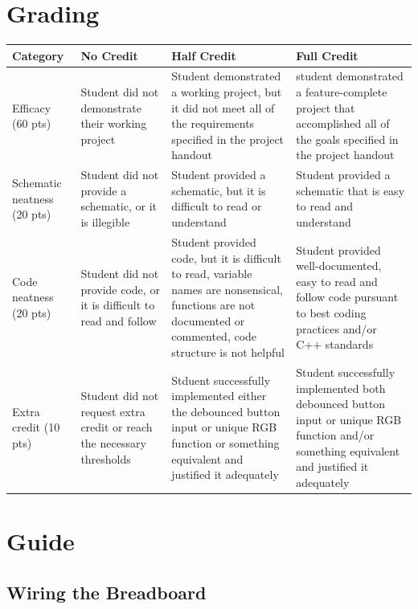 \documentclass{article}
\begin{document}
\section*{Grading}
\begin{tabular}{ | p{1in} | p{1.75in} | p{1.75in} | p{1.75in} | }
    \hline
    \textbf{Category} & \textbf{No Credit} & \textbf{Half Credit} & \textbf{Full Credit} \\

    \hline
    Efficacy (60 pts) & 
    Student did not demonstrate their working project & 
    Student demonstrated a working project, but it did not meet all of the requirements specified in the project handout & 
    student demonstrated a feature-complete project that accomplished all of the goals specified in the project handout \\
    \hline
    Schematic neatness (20 pts) & 
    Student did not provide a schematic, or it is illegible &
    Student provided a schematic, but it is difficult to read or understand &
    Student provided a schematic that is easy to read and understand \\
    \hline
    Code neatness (20 pts) &
    Student did not provide code, or it is difficult to read and follow &
    Student provided code, but it is difficult to read, variable names are nonsensical, functions are not documented or commented, code structure is not helpful &
    Student provided well-documented, easy to read and follow code pursuant to best coding practices and/or C++ standards \\
    \hline
    Extra credit (10 pts) &
    Student did not request extra credit or reach the necessary thresholds & 
    Stduent successfully implemented either the debounced button input or unique RGB function or something equivalent and justified it adequately &
    Student successfully implemented both debounced button input or unique RGB function and/or something equivalent and justified it adequately \\

    \hline
\end{tabular}

\section*{Guide}

    \subsection*{Wiring the Breadboard}
\end{document}

